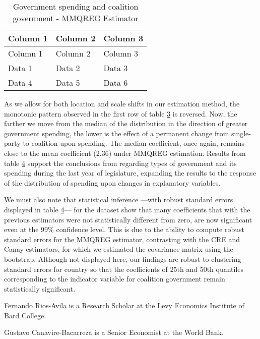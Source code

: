\documentclass[bib]{statapress}
\begin{document}
\begin{longtable}[]{@{}lll@{}}
\caption{Government spending and coalition government - MMQREG
Estimator}\tabularnewline
\toprule\noalign{}
Column 1 & Column 2 & Column 3 \\
\midrule\noalign{}
\endfirsthead
\toprule\noalign{}
Column 1 & Column 2 & Column 3 \\
\midrule\noalign{}
\endhead
\bottomrule\noalign{}
\endlastfoot
Data 1 & Data 2 & Data 3 \\
Data 4 & Data 5 & Data 6 \\
\end{longtable}

As we allow for both location and scale shifts in our estimation method,
the monotonic pattern observed in the first row of table
\hyperref[tab:mcanay_results]{3} is reversed. Now, the farther we move
from the median of the distribution in the direction of greater
government spending, the lower is the effect of a permanent change from
single-party to coalition upon spending. The median coefficient, once
again, remains close to the mean coefficient (2.36) under MMQREG
estimation. Results from table \hyperref[tab:mmqreg_results]{4} support
the conclusions from \citep{persson2007} regarding types of government
and its spending during the last year of legislature, expanding the
results to the response of the distribution of spending upon changes in
explanatory variables.

We must also note that statistical inference ---with robust standard
errors displayed in table \hyperref[tab:mmqreg_results]{4}--- for the
\citep{persson2007} dataset show that many coefficients that with the
previous estimators were not statistically different from zero, are now
significant even at the 99\% confidence level. This is due to the
ability to compute robust standard errors for the MMQREG estimator,
contrasting with the CRE and Canay estimators, for which we estimated
the covariance matrix using the bootstrap. Although not displayed here,
our findings are robust to clustering standard errors for country so
that the coefficients of 25th and 50th quantiles corresponding to the
indicator variable for coalition government remain statistically
significant.

\clearpage





\begin{aboutauthors}

Fernando Rios-Avila is a Research Scholar at the Levy Economics
Institute of Bard College.

Gustavo Canavire-Bacarreza is a Senior Economist at the World Bank.

\end{aboutauthors}
\end{document}
